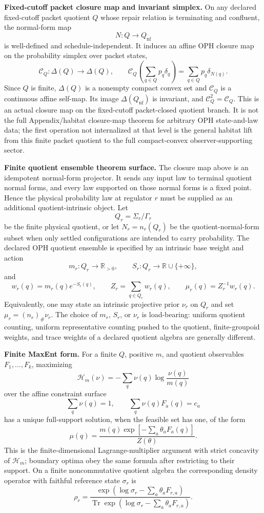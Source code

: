 \textbf{Fixed-cutoff packet closure map and invariant simplex.} On any declared fixed-cutoff
packet quotient \(Q\) whose repair relation is terminating and confluent, the normal-form map
\[
N:Q\to Q_{\mathrm{nf}}
\]
is well-defined and schedule-independent. It induces an affine OPH closure map on the probability
simplex over packet states,
\[
\mathcal C_Q:\Delta(Q)\to\Delta(Q),
\qquad
\mathcal C_Q\!\left(\sum_{q\in Q}p_q\delta_q\right)
=
\sum_{q\in Q}p_q\delta_{N(q)}.
\]
Since \(Q\) is finite, \(\Delta(Q)\) is a nonempty compact convex set and \(\mathcal C_Q\) is a
continuous affine self-map. Its image \(\Delta(Q_{\mathrm{nf}})\) is invariant, and
\(\mathcal C_Q^2=\mathcal C_Q\). This is an actual closure map on the fixed-cutoff packet-closed
quotient branch. It is not the full Appendix/habitat closure-map theorem for arbitrary OPH
state-and-law data; the first operation not internalized at that level is the general habitat lift
from this finite packet quotient to the full compact-convex observer-supporting sector.

\textbf{Finite quotient ensemble theorem surface.} The closure map above is an idempotent
normal-form projector. It sends any input law to terminal quotient normal forms, and every law
supported on those normal forms is a fixed point. Hence the physical probability law at regulator
\(r\) must be supplied as an additional quotient-intrinsic object. Let
\[
Q_r=\Sigma_r/\Gamma_r
\]
be the finite physical quotient, or let \(N_r=n_r(Q_r)\) be the quotient-normal-form subset when
only settled configurations are intended to carry probability. The declared OPH quotient ensemble
is specified by an intrinsic base weight and action
\[
m_r:Q_r\to \mathbb R_{>0},
\qquad
S_r:Q_r\to \mathbb R\cup\{+\infty\},
\]
and
\[
w_r(q)=m_r(q)e^{-S_r(q)},\qquad
Z_r=\sum_{q\in Q_r}w_r(q),\qquad
\mu_r(q)=Z_r^{-1}w_r(q).
\]
Equivalently, one may state an intrinsic projective prior \(\nu_r\) on \(Q_r\) and set
\(\mu_r=(n_r)_\#\nu_r\). The choice of \(m_r\), \(S_r\), or \(\nu_r\) is load-bearing:
uniform quotient counting, uniform representative counting pushed to the quotient, finite-groupoid
weights, and trace weights of a declared quotient algebra are generally different.

\textbf{Finite MaxEnt form.} For a finite \(Q\), positive \(m\), and quotient observables
\(F_1,\ldots,F_k\), maximizing
\[
\mathcal H_m(\nu)=-\sum_q\nu(q)\log\frac{\nu(q)}{m(q)}
\]
over the affine constraint surface
\[
\sum_q\nu(q)=1,\qquad \sum_q\nu(q)F_a(q)=c_a
\]
has a unique full-support solution, when the feasible set has one, of the form
\[
\mu(q)=
\frac{m(q)\exp[-\sum_a\theta_aF_a(q)]}{Z(\theta)}.
\]
This is the finite-dimensional Lagrange-multiplier argument with strict concavity of
\(\mathcal H_m\); boundary optima obey the same formula after restricting to their support. On a
finite noncommutative quotient algebra the corresponding density operator with faithful reference
state \(\sigma_r\) is
\[
\rho_r=
\frac{\exp(\log\sigma_r-\sum_a\theta_aF_{r,a})}
{\operatorname{Tr}\exp(\log\sigma_r-\sum_a\theta_aF_{r,a})}.
\]

